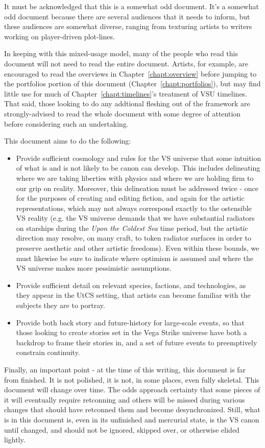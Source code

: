 It must be acknowledged that this is a somewhat odd document. It's a
somewhat odd document because there are several audiences that it
needs to inform, but these audiences are somewhat diverse, ranging
from texturing artists to writers working on player-driven plot-lines.

In keeping with this mixed-usage model, many of the people who read
this document will not need to read the entire document. Artists, for
example, are encouraged to read the overviews in
Chapter~\ref{chapt:overview} before jumping to the portfolios portion
of this document (Chapter~\ref{chapt:portfolios}), but may find little
use for much of Chapter~\ref{chapt:timelines}'s treatment of VSU
timelines. That said, those looking to do any addtional fleshing out
of the framework are strongly-advised to read the whole document with
some degree of attention before considering such an undertaking.

This document aims to do the following:
\begin{itemize}
\item Provide sufficient cosmology and rules for the VS universe that
  some intuition of what is and is not likely to be canon can
  develop. This includes delineating where we are taking liberties
  with physics and where we are holding firm to our grip on
  reality. Moreover, this delineation must be addressed twice - once
  for the purposes of creating and editing fiction, and again for the
  artistic representations, which may not always correspond exactly to
  the ostensible VS reality (e.g. the VS universe demands that we have
  substantial radiators on starships during the {\it Upon the Coldest
  Sea} time period, but the artistic direction may resolve, on many
  craft, to token radiator surfaces in order to preserve aesthetic and
  other artistic freedoms). Even within these bounds, we must likewise
  be sure to indicate where optimism is assumed and where the VS
  universe makes more pessimistic assumptions.
\item Provide sufficient detail on relevant species, factions, and
  technologies, as they appear in the UtCS setting, that artists can
  become familiar with the subjects they are to portray.
\item Provide both back story and future-history for large-scale
  events, so that those looking to create stories set in the Vega
  Strike universe have both a backdrop to frame their stories in, and
  a set of future events to preemptively constrain continuity.
\end{itemize}

Finally, an important point - at the time of this writing, this
document is far from finished. It is not polished, it is not, in some
places, even fully skeletal. This document will change over time. The
odds approach certainty that some pieces of it will eventually require
retconning and others will be missed during various changes that
should have retconned them and become desynchronized. Still, what is
in this document is, even in its unfinished and mercurial state, is
the VS canon until changed, and should not be ignored, skipped over,
or otherwise elided lightly.

